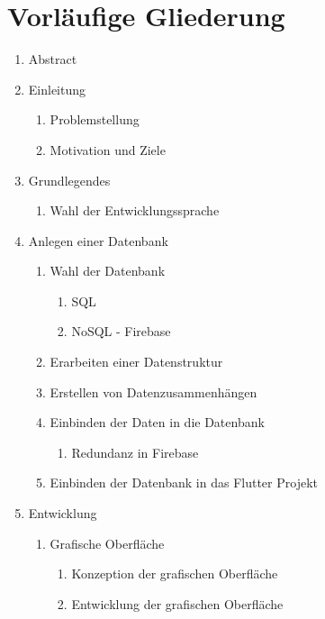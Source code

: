 
\section{Vorläufige Gliederung}
\begin{enumerate}
	\item Abstract
	\item Einleitung
		\begin{enumerate}
		\item Problemstellung
		\item Motivation und Ziele
		\end{enumerate}
	\item Grundlegendes
		\begin{enumerate}
		\item Wahl der Entwicklungssprache 
		\end{enumerate}
	\item Anlegen einer Datenbank
	\begin{enumerate}
		\item Wahl der Datenbank
		\begin{enumerate}
			\item SQL
			\item NoSQL - Firebase
		\end{enumerate}
		\item Erarbeiten einer Datenstruktur
		\item Erstellen von Datenzusammenhängen
		\item Einbinden der Daten in die Datenbank
			\begin{enumerate}
				\item Redundanz in Firebase
			\end{enumerate}
		\item Einbinden der Datenbank in das Flutter Projekt

	\end{enumerate}
	\item Entwicklung
		\begin{enumerate}
		\item Grafische Oberfläche
			\begin{enumerate}
			\item Konzeption der grafischen Oberfläche
			\item Entwicklung der grafischen Oberfläche
			\end{enumerate}


\end{enumerate}
\end{enumerate}
